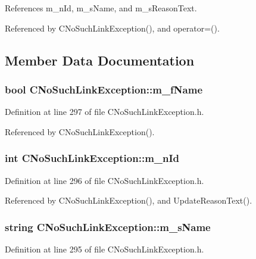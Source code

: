 References m\_\-n\-Id, m\_\-s\-Name, and m\_\-s\-Reason\-Text.

Referenced by CNo\-Such\-Link\-Exception(), and operator=().

\subsection{Member Data Documentation}
\subsubsection{\setlength{\rightskip}{0pt plus 5cm}bool CNo\-Such\-Link\-Exception::m\_\-f\-Name\hspace{0.3cm}{\tt  [private]}}\label{classCNoSuchLinkException_o2}




Definition at line 297 of file CNo\-Such\-Link\-Exception.h.

Referenced by CNo\-Such\-Link\-Exception().
\subsubsection{\setlength{\rightskip}{0pt plus 5cm}int CNo\-Such\-Link\-Exception::m\_\-n\-Id\hspace{0.3cm}{\tt  [private]}}\label{classCNoSuchLinkException_o1}




Definition at line 296 of file CNo\-Such\-Link\-Exception.h.

Referenced by CNo\-Such\-Link\-Exception(), and Update\-Reason\-Text().
\subsubsection{\setlength{\rightskip}{0pt plus 5cm}string CNo\-Such\-Link\-Exception::m\_\-s\-Name\hspace{0.3cm}{\tt  [private]}}\label{classCNoSuchLinkException_o0}




Definition at line 295 of file CNo\-Such\-Link\-Exception.h.

